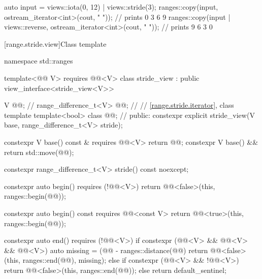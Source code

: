 \pnum
\begin{example}
\begin{codeblock}
auto input = views::iota(0, 12) | views::stride(3);
ranges::copy(input, ostream_iterator<int>(cout, " "));                  // prints 0 3 6 9
ranges::copy(input | views::reverse, ostream_iterator<int>(cout, " ")); // prints 9 6 3 0
\end{codeblock}
\end{example}

[range.stride.view]{Class template }

\begin{codeblock}
namespace std::ranges {
  template<@@ V>
    requires @@<V>
  class stride_view : public view_interface<stride_view<V>> {
    V @@;                                    // \expos
    range_difference_t<V> @@;              // \expos
    // \ref{range.stride.iterator}, class template 
    template<bool> class @@;              // \expos
  public:
    constexpr explicit stride_view(V base, range_difference_t<V> stride);

    constexpr V base() const & requires @@<V> { return @@; }
    constexpr V base() && { return std::move(@@); }

    constexpr range_difference_t<V> stride() const noexcept;

    constexpr auto begin() requires (!@@<V>) {
      return @@<false>(this, ranges::begin(@@));
    }

    constexpr auto begin() const requires @@<const V> {
      return @@<true>(this, ranges::begin(@@));
    }

    constexpr auto end() requires (!@@<V>) {
      if constexpr (@@<V> && @@<V> && @@<V>) {
        auto missing = (@@ - ranges::distance(@@) %
        return @@<false>(this, ranges::end(@@), missing);
      } else if constexpr (@@<V> && !@@<V>) {
        return @@<false>(this, ranges::end(@@));
      } else {
        return default_sentinel;
      }
    }

}}
\end{codeblock}
